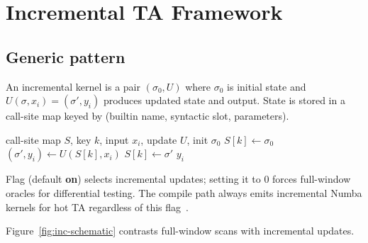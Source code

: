 \documentclass[11pt,a4paper]{article}
\begin{document}
\section{Incremental TA Framework}
\label{sec:inc}

\subsection{Generic pattern}
\label{sec:inc-pattern}

\begin{definition}
An incremental kernel is a pair $(\sigma_0,U)$ where $\sigma_0$ is initial
state and $U(\sigma,x_i)=(\sigma',y_i)$ produces updated state and output.
State is stored in a call-site map keyed by (builtin name, syntactic slot,
parameters).
\end{definition}

\begin{algorithm}[t]
\caption{Generic bar-mode incremental update}
\label{alg:generic}
\begin{algorithmic}[1]
\Require call-site map $S$, key $k$, input $x_i$, update $U$, init $\sigma_0$
  \State $S[k]\gets\sigma_0$
\EndIf
\State $(\sigma', y_i)\gets U(S[k], x_i)$
\State $S[k]\gets\sigma'$
\State \Return $y_i$ 
\end{algorithmic}
\end{algorithm}

Flag  (default \textbf{on}) selects incremental
updates; setting it to $0$ forces full-window oracles for differential testing.
The compile path always emits incremental Numba kernels for hot TA regardless
of this flag~\citep{lam2015numba,pynescript2026}.

Figure~\ref{fig:inc-schematic} contrasts full-window scans with incremental
updates.
\end{document}
